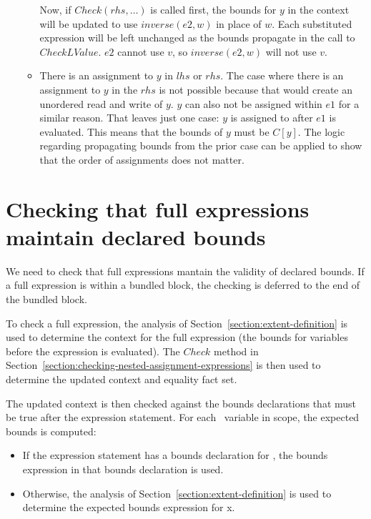 \begin{itemize}
\begin{itemize}
Now, if $Check(rhs, \ldots)$ is called first, the bounds for $y$ in the context will be updated to use
$inverse(e2, w)$ in place of $w$.  Each substituted expression will be left unchanged as the bounds
propagate in the call to $CheckLValue$.  $e2$ cannot use $v$, so $inverse(e2, w)$ will not use $v$.

\item There is an assignment to $y$ in $lhs$ or $rhs$.   The case where there is an assignment 
to $y$ in the $rhs$ is not possible because that would create an unordered read and write of $y$.
$y$ can also not be assigned within $e1$ for a similar reason.  That leaves just one case: $y$ is
assigned to after $e1$ is evaluated.  This means that the bounds of $y$ must be $C[y]$.   The logic
regarding propagating bounds from the prior case can be applied to show that the order of
assignments does not matter.
\end{itemize}
\end{itemize}


\section{Checking that full expressions maintain declared bounds}
\label{section:checking-expression-statements}

We need to check that full expressions mantain the validity of
declared bounds.  If a full expression is within a
bundled block, the checking is deferred to the end of the bundled block.

To check a full expression, the analysis of 
Section~\ref{section:extent-definition} is used
to determine the context for the full expression (the bounds
for variables before the expression is evaluated). The $Check$
method in Section~\ref{section:checking-nested-assignment-expressions}
is then used to determine the updated context and equality fact set.

The updated context is then checked against the bounds declarations that
must be true after the expression statement. For each
\arrayptr\ variable  in scope, the expected bounds is
computed:

\begin{itemize}
\item
  If the expression statement has a bounds declaration for , the
  bounds expression in that bounds declaration is used.
\item
  Otherwise, the analysis of Section~\ref{section:extent-definition}
  is used to determine the
  expected bounds expression for x.
\end{itemize}


